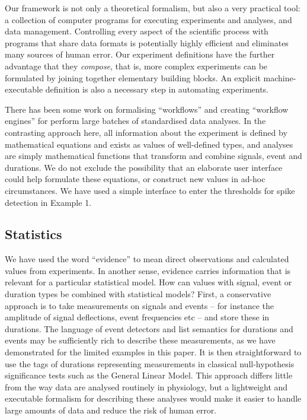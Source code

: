 Our framework is not only a theoretical formalism, but also a very
practical tool: a collection of computer programs for executing
experiments and analyses, and data management. Controlling every
aspect of the scientific process with programs that share data formats
is potentially highly efficient and eliminates many sources of human
error. Our experiment definitions have the further advantage that they
\emph{compose}, that is, more complex experiments can be formulated by
joining together elementary building blocks. An explicit
machine-executable definition is also a necessary step in automating
experiments.

There has been some work on formalising ``workflows'' and creating
``workflow engines'' for perform large batches of standardised data
analyses. In the contrasting approach here, all information about the
experiment is defined by mathematical equations and exists as values
of well-defined types, and analyses are simply mathematical functions
that transform and combine signals, event and durations. We do not
exclude the possibility that an elaborate user interface could help
formulate these equations, or construct new values in ad-hoc
circumstances. We have used a simple interface to enter the
thresholds for spike detection in Example 1. 

\subsection*{Statistics}

We have used the word ``evidence'' to mean direct observations and
calculated values from experiments. In another sense, evidence carries
information that is relevant for a particular statistical model. How
can values with signal, event or duration types be combined with
statistical models? First, a conservative approach is to take
measurements on signals and events -- for instance the amplitude of
signal deflections, event frequencies etc -- and store these in
durations. The language of event detectors and list semantics for
durations and events may be sufficiently rich to describe these
measurements, as we have demonstrated for the limited examples in this
paper. It is then straightforward to use the tags of durations
representing measurements in classical null-hypothesis significance
tests such as the General Linear Model. This approach differs little
from the way data are analysed routinely in physiology, but a
lightweight and executable formalism for describing these analyses
would make it easier to handle large amounts of data and reduce the
risk of human error.

